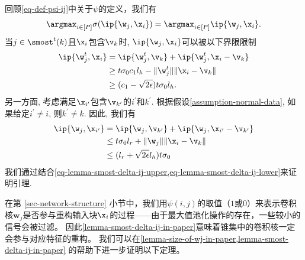\begin{myproof}
    \label{proof-lemma-smost-delta-ij}
    回顾\cref{eq-def-psi-ij}中关于$\psi$的定义，我们有
    \begin{equation}
        \argmax_{i \in [P]} \sigma(\ip{\w_j,\x_i}) = \argmax_{i \in [P]} \ip{\w_j,\x_i}.
    \end{equation}
当$j \in \smost^t(k)$且$\x_i$包含$\v_k$时, $\ip{ \w_j , \x_{i} }$可以被以下界限限制
    \begin{equation}\label{eq-lemma-smost-delta-ij-upper}\begin{aligned}
        \ip{ \w_j^t , \x_{i} } 
        &= \ip{ \w_j^t , \v_{k} } + \ip{ \w_j^t , \x_{i} - \v_{k} } \\
        &\geq  t \sigma_0 c_1 l_h - \|\w_j^t\| \| \x_i - \v_k \| \\
        &\geq (c_1 - \sqrt{2\epsilon}) t \sigma_0 l_h.
    \end{aligned}\end{equation}
另一方面, 考虑满足$\x_{i^{\prime}}$包含$\v_{k^{\prime}}$的$i^{\prime}$和$k^{\prime}$.
    根据假设\cref{assumption-normal-data}, 如果给定$i^{\prime} \neq i$, 则$k^{\prime} \neq k$.
    因此, 我们有
    \begin{equation}\label{eq-lemma-smost-delta-ij-lower}\begin{aligned}
        \ip{ \w_j , \x_{i^{\prime}} } 
        &= \ip{ \w_j , \v_{k^{\prime} } } + \ip{ \w_j , \x_{i^{\prime} } - \v_{k^{\prime} } } \\
        &\leq t \sigma_0 l_r + \|\w_j\| \| \x_i - \v_k \| \\
        &\leq (l_r +  \sqrt{2\epsilon} l_h ) t \sigma_0 
    \end{aligned}\end{equation}
    我们通过结合\cref{eq-lemma-smost-delta-ij-upper,eq-lemma-smost-delta-ij-lower}来证明引理.
\end{myproof}


在第 \ref{sec-network-structure} 小节中，我们用$\psi(i,j)$的取值（$1$或$0$）来表示卷积核$\boldsymbol{w}_j$是否参与重构输入块$\x_i$的过程——由于最大值池化操作的存在，一些较小的信号会被过滤。
因此\cref{lemma-smost-delta-ij-in-paper}意味着锥集中的卷积核一定会参与对应特征的重构。
我们可以在\cref{lemma-size-of-wj-in-paper,lemma-smost-delta-ij-in-paper} 的帮助下进一步证明以下定理。

